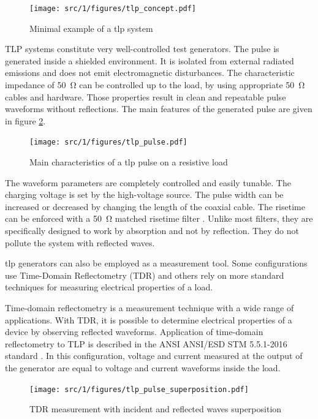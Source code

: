\begin{figure}[!h]
  \centering
  \texttt{[image: src/1/figures/tlp\_concept.pdf]}
  \caption{Minimal example of a \gls{tlp} system}
  \label{tlp_concept}
\end{figure}

TLP systems constitute very well-controlled test generators.
The pulse is generated inside a shielded environment.
It is isolated from external radiated emissions and does not emit electromagnetic disturbances.
The characteristic impedance of \SI{50}{\ohm} can be controlled up to the load, by using appropriate \SI{50}{\ohm} cables and hardware.
Those properties result in clean and repeatable pulse waveforms without reflections.
The main features of the generated pulse are given in figure \ref{tlp_pulse}.

\begin{figure}[!h]
  \centering
  \texttt{[image: src/1/figures/tlp\_pulse.pdf]}
  \caption{Main characteristics of a \gls{tlp} pulse on a resistive load}
  \label{tlp_pulse}
\end{figure}

The waveform parameters are completely controlled and easily tunable.
The charging voltage is set by the high-voltage source.
The pulse width can be increased or decreased by changing the length of the coaxial cable.
The risetime can be enforced with a \SI{50}{\ohm} matched risetime filter \cite{cao-risetime-filter, gaussian-lpf}.
Unlike most filters, they are specifically designed to work by absorption and not by reflection.
They do not pollute the system with reflected waves.

\gls{tlp} generators can also be employed as a measurement tool.
Some configurations use Time-Domain Reflectometry (TDR) and others rely on more standard techniques for measuring electrical properties of a load.

Time-domain reflectometry is a measurement technique with a wide range of applications.
With TDR, it is possible to determine electrical properties of a device by observing reflected waveforms.
Application of time-domain reflectometry to TLP is described in the ANSI ANSI/ESD STM 5.5.1-2016 standard \cite{tlp-standard}.
In this configuration, voltage and current measured at the output of the generator are equal to voltage and current waveforms inside the load.

\begin{figure}[!h]
  \centering
  \texttt{[image: src/1/figures/tlp\_pulse\_superposition.pdf]}
  \caption{TDR measurement with incident and reflected waves superposition}
  \label{fig:tlp-superposition}
\end{figure}

